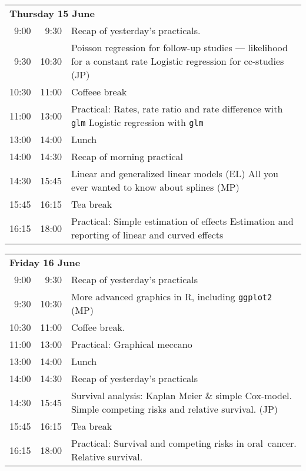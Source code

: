 \noindent
\begin{tabular}{r@{ -- }rp{13cm}}
\multicolumn{3}{l}{\bf Thursday 15 June} \\
 9:00 &  9:30 & Recap of yesterday's practicals. \\
 9:30 & 10:30 & Poisson regression for follow-up studies ---
                likelihood for a constant rate \newline
                Logistic regression for cc-studies (JP) \\
10:30 & 11:00 & Coffeee break \\
11:00 & 13:00 & Practical: Rates, rate ratio and rate difference with \texttt{glm}\newline
                Logistic regression with \texttt{glm} \\
13:00 & 14:00 & Lunch \\
14:00 & 14:30 & Recap of morning practical \\
14:30 & 15:45 & Linear and generalized linear models (EL) \newline
                All you ever wanted to know about splines (MP) \\
15:45 & 16:15 & Tea break\\
16:15 & 18:00 & Practical: Simple estimation of effects \newline
                Estimation and reporting of linear and curved effects \\
\end{tabular}

\noindent
\begin{tabular}{r@{ -- }rp{13cm}}
 \multicolumn{3}{l}{\bf Friday 16 June} \\
 9:00 &  9:30 & Recap of yesterday's practicals \\
 9:30 & 10:30 & More advanced graphics in R, including \texttt{ggplot2} (MP)\\
10:30 & 11:00 & Coffee break. \\
11:00 & 13:00 & Practical: Graphical meccano \\
13:00 & 14:00 & Lunch\\
14:00 & 14:30 & Recap of yesterday's practicals \\
14:30 & 15:45 & Survival analysis: Kaplan Meier \& simple
                Cox-model. Simple competing risks and relative
                survival. (JP)\\
15:45 & 16:15 & Tea break\\
16:15 & 18:00 & Practical: Survival and competing risks in oral\
                cancer. Relative survival.\\
\end{tabular}

